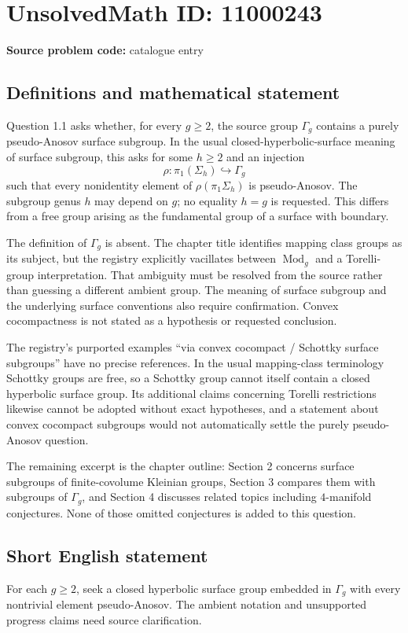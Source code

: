\documentclass[11pt]{article}
\begin{document}
\section*{UnsolvedMath ID: 11000243}
\textbf{Source problem code:} catalogue entry
\subsection{Definitions and mathematical statement}
Question 1.1 asks whether, for every $g\geq2$, the source group $\Gamma_g$ contains a purely pseudo-Anosov surface subgroup. In the usual closed-hyperbolic-surface meaning of surface subgroup, this asks for some $h\geq2$ and an injection
\[
 \rho:\pi_1(\Sigma_h)\hookrightarrow\Gamma_g
\]
such that every nonidentity element of $\rho(\pi_1\Sigma_h)$ is pseudo-Anosov. The subgroup genus $h$ may depend on $g$; no equality $h=g$ is requested. This differs from a free group arising as the fundamental group of a surface with boundary.

The definition of $\Gamma_g$ is absent. The chapter title identifies mapping class groups as its subject, but the registry explicitly vacillates between $\operatorname{Mod}_g$ and a Torelli-group interpretation. That ambiguity must be resolved from the source rather than guessing a different ambient group. The meaning of surface subgroup and the underlying surface conventions also require confirmation. Convex cocompactness is not stated as a hypothesis or requested conclusion.

The registry's purported examples ``via convex cocompact / Schottky surface subgroups'' have no precise references. In the usual mapping-class terminology Schottky groups are free, so a Schottky group cannot itself contain a closed hyperbolic surface group. Its additional claims concerning Torelli restrictions likewise cannot be adopted without exact hypotheses, and a statement about convex cocompact subgroups would not automatically settle the purely pseudo-Anosov question.

The remaining excerpt is the chapter outline: Section 2 concerns surface subgroups of finite-covolume Kleinian groups, Section 3 compares them with subgroups of $\Gamma_g$, and Section 4 discusses related topics including $4$-manifold conjectures. None of those omitted conjectures is added to this question.
\subsection{Short English statement}
For each $g\geq2$, seek a closed hyperbolic surface group embedded in $\Gamma_g$ with every nontrivial element pseudo-Anosov. The ambient notation and unsupported progress claims need source clarification.
\end{document}
